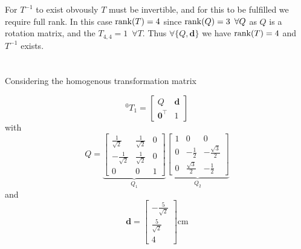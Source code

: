 \documentclass[a4paper]{scrartcl}
\begin{document}
For $T^{-1}$ to exist obvously $T$ must be invertible, and for this to be fulfilled we require full rank. In this case $\rank(T) = 4$ since $\rank(Q) = 3 \enspace \forall Q$ as $Q$ is a rotation matrix, and the $T_{4,4} = 1 \enspace \forall T$. Thus $\forall \{Q, \bm{d}\}$ we have $\rank(T) = 4$ and $T^{-1}$ exists.

\section{}
Considering the homogenous transformation matrix

\begin{equation}
    ^0T_1 = \begin{bmatrix}
        Q & \bm{d} \\ \bm{0}^\top & 1
    \end{bmatrix}
\end{equation}
with
\begin{equation}
    Q = \underbrace{\begin{bmatrix}
        \frac{1}{\sqrt{2}} & \frac{1}{\sqrt{2}} & 0 \\
        -\frac{1}{\sqrt{2}} & \frac{1}{\sqrt{2}} & 0 \\
        0 & 0 & 1
    \end{bmatrix}}_{Q_1}
    \underbrace{\begin{bmatrix}
        1 & 0 & 0 \\
        0 & -\frac{1}{2} & -\frac{\sqrt{3}}{2} \\
        0 & \frac{\sqrt{3}}{2} & -\frac{1}{2}
    \end{bmatrix}}_{Q_2}
\end{equation}
and 
\begin{equation}
    \bm{d} = \begin{bmatrix}
        -\frac{5}{\sqrt{2}} \\ \frac{5}{\sqrt{2}} \\ 4
    \end{bmatrix} \si{\cm}
\end{equation}
\end{document}

